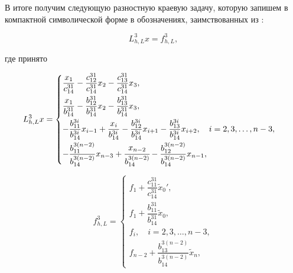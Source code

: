 В итоге получим следующую разностную краевую задачу, которую запишем в компактной символической форме в обозначениях, заимствованных из \cite{mc:bib6}:

\begin{equation}

\label{mc:eq10}

   L_{h,L}^3x=f_{h,L}^3,

\end{equation}

где принято

\begin{equation}

\label{mc:eq12}

   L_{h,L}^3x

=\begin{cases}

\dfrac{x_1}{c_{14}^{31}}-\dfrac{c_{12}^{31}}{c_{14}^{31}} x_{2}-\dfrac{c_{13}^{31}}{c_{14}^{31}} x_{3},

\\[3mm]

\dfrac{x_1}{b_{14}^{31}}-\dfrac{b_{12}^{31}}{b_{14}^{31}} x_{2}-\dfrac{b_{13}^{31}}{b_{14}^{31}} x_{3},

\\[3mm]

-\dfrac{b_{11}^{3i}}{b_{14}^{3i}} x_{i-1}+\dfrac{x_i}{b_{14}^{3i}}-\dfrac{b_{12}^{3i}}{b_{14}^{3i}} x_{i+1}-\dfrac{b_{13}^{3i}}{b_{14}^{3i}} x_{i+2},\quad  i=2,  3,  \dots,  n-3,

\\[3mm]

-\dfrac{b_{11}^{3(n-2)}}{b_{14}^{3(n-2)}} x_{n-3}+\cfrac{x_{n-2}}{b_{14}^{3(n-2)}}-\dfrac{b_{12}^{3(n-2)}}{b_{14}^{3(n-2)}} x_{n-1},

\end{cases}

\end{equation}

\begin{equation}

\label{mc:eq12}

   f_{h,L}^3=

\begin{cases}

f_{1}+\dfrac{c_{11}^{31}}{c_{14}^{31}} \widetilde{x}_0',

\\[3mm]

f_{1}+\dfrac{b_{11}^{31}}{b_{14}^{31}} \widetilde{x}_0,

\\[3mm]

f_{i},\quad  i=2,  3,  \dots,  n-3,

\\[1mm]

f_{n-2}+\dfrac{b_{13}^{3(n-2)}}{b_{14}^{3(n-2)}} \widetilde{x}_n,

\end{cases}

\end{equation}

